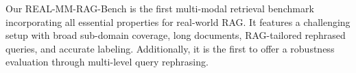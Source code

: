 \vspace{0.1cm}
\noindent
Our REAL-MM-RAG-Bench is the first multi-modal retrieval benchmark incorporating all essential properties for real-world RAG. It features a challenging setup with broad sub-domain coverage, long documents, RAG-tailored rephrased queries, and accurate labeling. Additionally, it is the first to offer a robustness evaluation through multi-level query rephrasing.